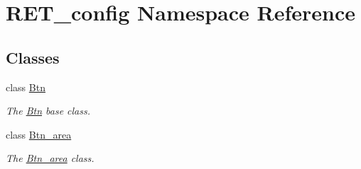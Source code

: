 \hypertarget{namespaceRET__config}{}\section{R\+E\+T\+\_\+config Namespace Reference}
\label{namespaceRET__config}
\subsection*{Classes}
\begin{DoxyCompactItemize}
\item 
class \hyperlink{classRET__config_1_1Btn}{Btn}
\begin{DoxyCompactList}\small\item\em The \hyperlink{classRET__config_1_1Btn}{Btn} base class. \end{DoxyCompactList}\item 
class \hyperlink{classRET__config_1_1Btn__area}{Btn\+\_\+area}
\begin{DoxyCompactList}\small\item\em The \hyperlink{classRET__config_1_1Btn__area}{Btn\+\_\+area} class. \end{DoxyCompactList}\end{DoxyCompactItemize}
